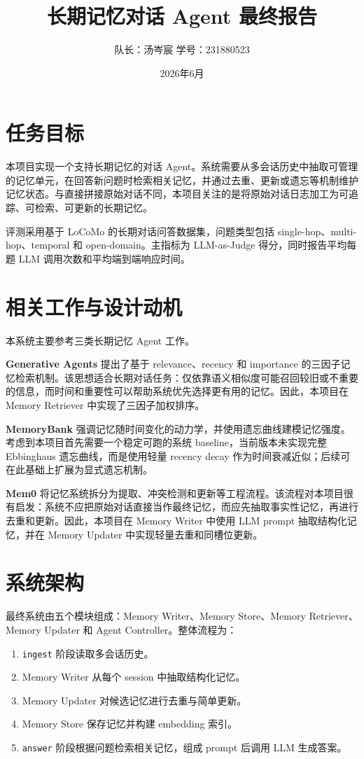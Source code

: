 \documentclass[UTF8,a4paper,11pt]{ctexart}
\title{\textbf{长期记忆对话 Agent 最终报告}}
\author{队长：汤岑宸 \quad 学号：231880523}
\date{2026年6月}
\begin{document}
\maketitle

\section{任务目标}

本项目实现一个支持长期记忆的对话 Agent。系统需要从多会话历史中抽取可管理的记忆单元，在回答新问题时检索相关记忆，并通过去重、更新或遗忘等机制维护记忆状态。与直接拼接原始对话不同，本项目关注的是将原始对话日志加工为可追踪、可检索、可更新的长期记忆。

评测采用基于 LoCoMo 的长期对话问答数据集，问题类型包括 single-hop、multi-hop、temporal 和 open-domain。主指标为 LLM-as-Judge 得分，同时报告平均每题 LLM 调用次数和平均端到端响应时间。

\section{相关工作与设计动机}

本系统主要参考三类长期记忆 Agent 工作。

\textbf{Generative Agents} 提出了基于 relevance、recency 和 importance 的三因子记忆检索机制。该思想适合长期对话任务：仅依靠语义相似度可能召回较旧或不重要的信息，而时间和重要性可以帮助系统优先选择更有用的记忆。因此，本项目在 Memory Retriever 中实现了三因子加权排序。

\textbf{MemoryBank} 强调记忆随时间变化的动力学，并使用遗忘曲线建模记忆强度。考虑到本项目首先需要一个稳定可跑的系统 baseline，当前版本未实现完整 Ebbinghaus 遗忘曲线，而是使用轻量 recency decay 作为时间衰减近似；后续可在此基础上扩展为显式遗忘机制。

\textbf{Mem0} 将记忆系统拆分为提取、冲突检测和更新等工程流程。该流程对本项目很有启发：系统不应把原始对话直接当作最终记忆，而应先抽取事实性记忆，再进行去重和更新。因此，本项目在 Memory Writer 中使用 LLM prompt 抽取结构化记忆，并在 Memory Updater 中实现轻量去重和同槽位更新。

\section{系统架构}

最终系统由五个模块组成：Memory Writer、Memory Store、Memory Retriever、Memory Updater 和 Agent Controller。整体流程为：

\begin{enumerate}
  \item \texttt{ingest} 阶段读取多会话历史。
  \item Memory Writer 从每个 session 中抽取结构化记忆。
  \item Memory Updater 对候选记忆进行去重与简单更新。
  \item Memory Store 保存记忆并构建 embedding 索引。
  \item \texttt{answer} 阶段根据问题检索相关记忆，组成 prompt 后调用 LLM 生成答案。
\end{enumerate}
\end{document}

